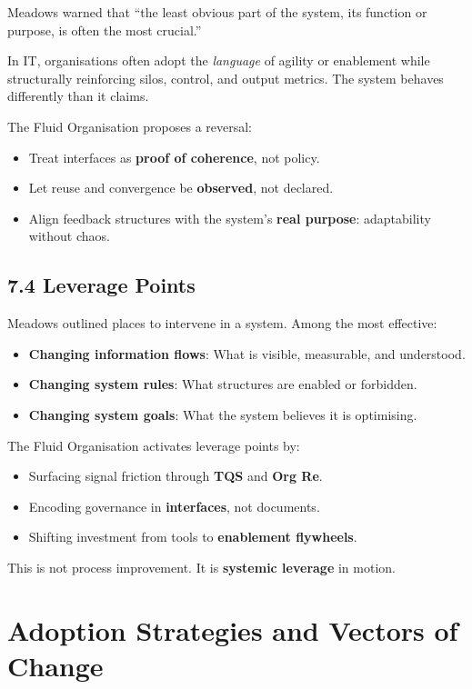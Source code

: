 \documentclass[12pt]{article}
\begin{document}
Meadows warned that “the least obvious part of the system, its function or purpose, is often the most crucial.”

In IT, organisations often adopt the \textit{language} of agility or enablement while structurally reinforcing silos, control, and output metrics. The system behaves differently than it claims.

The Fluid Organisation proposes a reversal:
\begin{itemize}
    \item Treat interfaces as \textbf{proof of coherence}, not policy.
    \item Let reuse and convergence be \textbf{observed}, not declared.
    \item Align feedback structures with the system’s \textbf{real purpose}: adaptability without chaos.
\end{itemize}

\subsection*{7.4 Leverage Points}

Meadows outlined places to intervene in a system. Among the most effective:
\begin{itemize}
    \item \textbf{Changing information flows}: What is visible, measurable, and understood.
    \item \textbf{Changing system rules}: What structures are enabled or forbidden.
    \item \textbf{Changing system goals}: What the system believes it is optimising.
\end{itemize}

The Fluid Organisation activates leverage points by:
\begin{itemize}
    \item Surfacing signal friction through \textbf{TQS} and \textbf{Org Re}.
    \item Encoding governance in \textbf{interfaces}, not documents.
    \item Shifting investment from tools to \textbf{enablement flywheels}.
\end{itemize}

This is not process improvement. It is \textbf{systemic leverage} in motion.

\section{Adoption Strategies and Vectors of Change}
\end{document}

